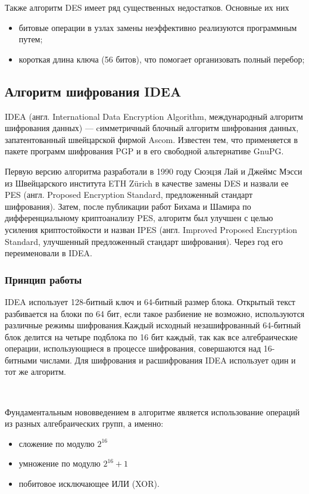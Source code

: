 \documentclass[a4paper]{report}
\begin{document}
Также алгоритм DES имеет ряд существенных недостатков. Основные их них 
\begin{itemize}
\item битовые операции в узлах замены неэффективно реализуются программ­ным путем;
\item  короткая длина ключа (56 битов), что помогает организо­вать полный перебор;
\end{itemize}

\subsection{Алгоритм шифрования IDEA}
IDEA (англ. International Data Encryption Algorithm, международный алгоритм шифрования данных) — cимметричный блочный алгоритм шифрования данных, запатентованный швейцарской фирмой Ascom. Известен тем, что применяется в пакете программ шифрования PGP и в его свободной альтернативе GnuPG.

Первую версию алгоритма разработали в 1990 году Сюэцзя Лай и Джеймс Мэсси из Швейцарского института ETH Zürich в качестве замены DES и назвали ее PES (англ. Proposed Encryption Standard, предложенный стандарт шифрования). Затем, после публикации работ Бихама и Шамира по дифференциальному криптоанализу PES, алгоритм был улучшен с целью усиления криптостойкости и назван IPES (англ. Improved Proposed Encryption Standard, улучшенный предложенный стандарт шифрования). Через год его переименовали в IDEA.

\subsubsection{Принцип работы}

IDEA использует 128-битный ключ и 64-битный размер блока. Открытый текст разбивается на блоки по 64 бит, если такое разбиение не возможно, используются различные режимы шифрования.Каждый исходный незашифрованный 64-битный блок делится на четыре подблока по 16 бит каждый, так как все алгебраические операции, использующиеся в процессе шифрования, совершаются над 16-битными числами. Для шифрования и расшифрования IDEA использует один и тот же алгоритм.

~

Фундаментальным нововведением в алгоритме является использование операций из разных алгебраических групп, а именно:
\begin{itemize}
\item сложение по модулю $2^{16}$
\item умножение по модулю $2^{16}+1$
\item побитовое исключающее ИЛИ (XOR).
\end{itemize}
\end{document}
